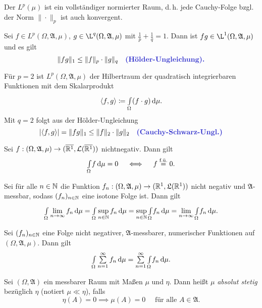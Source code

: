 \documentclass{cheat-sheet}
\newcommand{\Alg}{\mathfrak{A}} %
\newcommand{\LebAlg}{\mathfrak{L}} %
\renewcommand{\ER}{\overline{\R^1}} %
\newcommand{\fue}{\overset{\text{f.ü.}}} %
\newcommand{\IntOmu}[1]{\Int{\Omega}{}{#1}{\mu}} %
\begin{document}
\begin{satz}
  Der $L^p(\mu)$ ist ein vollständiger normierter Raum, d.\,h. jede Cauchy-Folge bzgl. der Norm $\| \cdot \|_p$ ist auch konvergent.
\end{satz}

\begin{satz}
  Sei $f \in L^p(\Omega, \Alg, \mu)$, $g \in \L^q(\Omega, \Alg, \mu)$ mit $\tfrac{1}{p} + \tfrac{1}{q} = 1$. Dann ist $fg \in \L^1(\Omega, \Alg, \mu)$ und es gilt
  \[ \norm{fg}_1 \leq \norm{f}_p \cdot \norm{g}_q \quad \text{\emph{(Hölder-Ungleichung).}} \]
\end{satz}

\begin{bem}
  Für $p = 2$ ist $L^p(\Omega, \Alg, \mu)$ der Hilbertraum der quadratisch integrierbaren Funktionen mit dem Skalarprodukt
  \[ \langle f , g \rangle \coloneqq \IntOmu{(f \cdot g)}. \]
  Mit $q = 2$ folgt aus der Hölder-Ungleichung
  \[ \abs{\langle f , g \rangle} = \norm{fg}_1 \leq \norm{f}_2 \cdot \norm{g}_2 \quad \text{\emph{(Cauchy-Schwarz-Ungl.)}} \]
\end{bem}

\begin{satz}
  Sei $f : (\Omega, \Alg, \mu) \to (\ER, \mathcal{L}(\ER))$ nichtnegativ. Dann gilt
  \[ \IntOmu{f} = 0 \quad \iff \quad f \fue{=} 0. \]
\end{satz}



\begin{satz}
  Sei für alle $n \in \mathbb{N}$ die Funktion $f_n : (\Omega, \Alg, \mu) \to (\R^1, \LebAlg(\R^1))$ nicht negativ und $\Alg$-messbar, sodass $(f_n)_{n \in \mathbb{N}}$ eine isotone Folge ist. Dann gilt
  \[ \IntOmu{\lim_{n \to \infty} f_n} = \IntOmu{\sup_{n \in \N} f_n} = \sup_{n \in \N} \IntOmu{f_n} = \lim_{n \to \infty} \IntOmu{f_n}. \]
\end{satz}

\begin{kor}
  Sei $(f_n)_{n \in \mathbb{N}}$ eine Folge nicht negativer, $\Alg$-messbarer, numerischer Funktionen auf $(\Omega, \Alg, \mu)$. Dann gilt
  \[ \IntOmu{\sum_{n=1}^{\infty} f_n} = \sum_{n=1}^\infty \IntOmu{f_n}. \]
\end{kor}

\begin{defn}
  Sei $(\Omega, \Alg)$ ein messbarer Raum mit Maßen $\mu$ und $\eta$. Dann heißt $\mu$ \emph{absolut stetig} bezüglich $\eta$ (notiert $\mu \ll \eta$), falls
  \[ \eta(A) = 0 \implies \mu(A) = 0 \quad \text{ für alle } A \in \Alg. \]
\end{defn}
\end{document}
